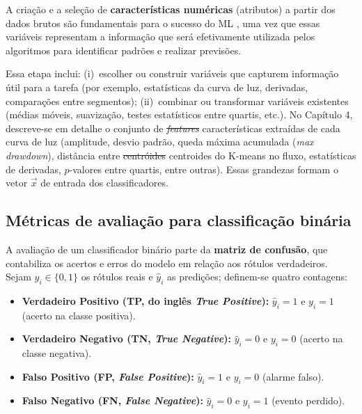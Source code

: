 \documentclass[msc]{on} %
\makeatletter
\providecommand{\DIFaddtex}[1]{{\protect\color{red}#1}} %
\providecommand{\DIFdeltex}[1]{{\protect\color{red}\sout{#1}}} %
\providecommand{\DIFaddbegin}{} %
\providecommand{\DIFaddend}{} %
\providecommand{\DIFdelbegin}{} %
\providecommand{\DIFdelend}{} %
\providecommand{\DIFadd}[1]{\texorpdfstring{\DIFaddtex{#1}}{#1}} %
\providecommand{\DIFdel}[1]{\texorpdfstring{\DIFdeltex{#1}}{}} %
\let\sout@orig\sout %
\renewcommand{\sout}[1]{\ifmmode\text{\sout@orig{\ensuremath{#1}}}\else\sout@orig{#1}\fi} %
\makeatother
\begin{document}
A criação e a seleção de \textbf{características numéricas} (atributos) a partir dos dados brutos são fundamentais para o sucesso do ML \citep{geron2019maos}, uma vez que essas variáveis representam a informação que será efetivamente utilizada pelos algoritmos para identificar padrões e realizar previsões.

Essa etapa inclui: (i)~escolher ou construir variáveis que capturem informação útil para a tarefa (por exemplo, estatísticas da curva de luz, derivadas, comparações entre segmentos); (ii)~combinar ou transformar variáveis existentes (médias móveis, suavização, testes estatísticos entre quartis, etc.). No Capítulo 4, descreve-se em detalhe o conjunto de \DIFdelbegin \textit{\DIFdel{features}} %
\DIFdelend\ifhmode\hskip0pt\fi \DIFaddbegin \DIFadd{características }\DIFaddend extraídas de cada curva de luz (amplitude, desvio padrão, queda máxima acumulada (\textit{max drawdown}), distância entre \DIFdelbegin \DIFdel{centróides }\DIFdelend\ifhmode\hskip0pt\fi \DIFaddbegin \DIFadd{centroides }\DIFaddend do K-means no fluxo, estatísticas de derivadas, \(p\)-valores entre quartis, entre outras). Essas grandezas formam o vetor \(\vec{x}\) de entrada dos classificadores.

\subsection{Métricas de avaliação para classificação binária}
\label{sec:metricas_avaliacao}

A avaliação de um classificador binário parte da \textbf{matriz de confusão}, que contabiliza os acertos e erros do modelo em relação aos rótulos verdadeiros. Sejam \(y_i \in \{0,1\}\) os rótulos reais e \(\hat{y}_i\) as predições; definem-se quatro contagens:

\begin{itemize}
	\item \textbf{Verdadeiro Positivo (TP, do inglês \textit{True Positive}):} $\hat{y}_i = 1$ e $y_i = 1$ (acerto na classe positiva).
	\item \textbf{Verdadeiro Negativo (TN, \textit{True Negative}):} $\hat{y}_i = 0$ e $y_i = 0$ (acerto na classe negativa).
	\item \textbf{Falso Positivo (FP, \textit{False Positive}):} $\hat{y}_i = 1$ e $y_i = 0$ (alarme falso).
	\item \textbf{Falso Negativo (FN, \textit{False Negative}):} $\hat{y}_i = 0$ e $y_i = 1$ (evento perdido).
\end{itemize}
\end{document}
